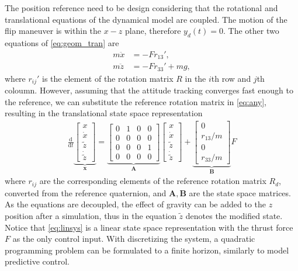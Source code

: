 The position reference need to be design considering that the rotational and translational equations of the dynamical model are coupled. The motion of the flip maneuver is within the $x-z$ plane, therefore $y_d(t) = 0$. The other two equations of \eqref{eq:geom_tran} are
\begin{subequations}\label{eq:any}
    \begin{align}
       m \ddot x & = - Fr_{13}',\\
        m \ddot{z} & = - F r_{33}' + mg,  
    \end{align}
\end{subequations}
where $r_{ij}'$ is the element of the rotation matrix $R$ in the $i$th row and $j$th coloumn. However, assuming that the attitude tracking converges fast enough to the reference, we can substitute the reference rotation matrix in \eqref{eq:any}, resulting in the translational state space representation
    \begin{align}\label{eq:linsys}
    \frac{\mathrm{d}}{\mathrm{d}t} \underbrace{\begin{bmatrix} x \\ \dot x \\ \tilde z \\ \dot{\tilde{z}}\end{bmatrix}}_{\mathbf{x}} = \underbrace{\begin{bmatrix} 0 & 1 & 0 & 0 \\ 0 & 0 & 0 & 0 \\ 0 & 0 & 0 & 1 \\ 0 & 0 & 0 & 0 \end{bmatrix}}_{\mathbf{A}} \begin{bmatrix} x \\ \dot x \\ \tilde z \\ \dot{\tilde{z}} \end{bmatrix} + \underbrace{\begin{bmatrix} 0 \\ r_{13}/m \\ 0 \\ r_{33}/m \end{bmatrix}}_{\mathbf{B}}  F
    \end{align}
where $r_{ij}$ are the corresponding elements of the reference rotation matrix $R_d$, converted from the reference quaternion, and $\mathbf A, \mathbf B$ are the state space matrices. As the equations are decoupled, the effect of gravity can be added to the $z$ position after a simulation, thus in the equation $\tilde{z}$ denotes the modified state. Notice that \eqref{eq:linsys} is a linear state space representation with the thrust force $F$ as the only control input. With discretizing the system, a quadratic programming problem can be formulated to a finite horizon, similarly to model predictive control.

